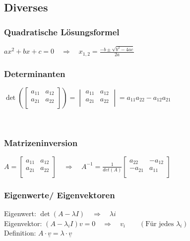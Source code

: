 \subsection{Diverses}
\begin{minipage}[t]{9.5cm}
	\subsubsection{Quadratische Lösungsformel}
	$ax^2+bx+c=0\quad\Rightarrow\quad x_{1,2}=\frac{-b\pm\sqrt{b^2-4ac}}{2a}$
\end{minipage}
\hfill
\begin{minipage}[t]{9.5cm}
	\subsubsection{Determinanten}
	$\det\left(
		\begin{bmatrix}
				a_{11} & a_{12} \\
				a_{21} & a_{22} \\
			\end{bmatrix}\right)=
		\begin{vmatrix}
			a_{11} & a_{12} \\
			a_{21} & a_{22} \\
		\end{vmatrix}=a_{11}a_{22}-a_{12}a_{21}$
\end{minipage}\\

\begin{minipage}[t]{9.5cm}
	\subsubsection{Matrizeninversion}
	$A=\begin{bmatrix}
			a_{11} & a_{12} \\
			a_{21} & a_{22} \\
		\end{bmatrix}\quad\Rightarrow\quad
		A^{-1}=\frac{1}{det(A)}
		\begin{bmatrix}
			a_{22}  & -a_{12} \\
			-a_{21} & a_{11}  \\
		\end{bmatrix}$
\end{minipage}
\hfill
\begin{minipage}[t]{9.5cm}
	\subsubsection{Eigenwerte/ Eigenvektoren}
	Eigenwert: $\det(A-\lambda I)\quad\Rightarrow\quad \lambda i$\\
	Eigenvektor: $(A-\lambda_i I)v=0\quad\Rightarrow\quad v_i\qquad(\text{Für jedes }\lambda_i)$\\
	Definition: $ A\cdot \underline{v} = \lambda \cdot \underline{v} $
\end{minipage}
\clearpage

